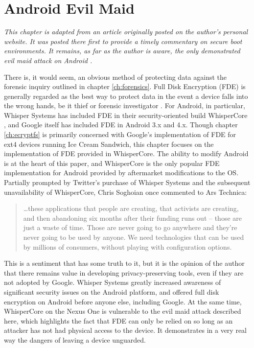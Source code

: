 \chapter{Android Evil Maid}
\label{ch:fde}

\emph{This chapter is adapted from an article originally posted on the author's personal website. It was posted there first to
provide a timely commentary on secure boot environments. It remains, as far as the author is aware, the only demonstrated evil maid
attack on Android \cite{androidevilmaid}.}

There is, it would seem, an obvious method of protecting data against the forensic inquiry outlined in chapter \ref{ch:forensics}.
Full Disk Encryption (FDE) is generally regarded as the best way to protect data in the event a device falls into the wrong hands,
be it thief or forensic investigator \cite{fdeworks}.  For Android, in particular, Whisper Systems has included FDE in their
security-oriented build WhisperCore \cite{whispercore}, and Google itself has included FDE in Android 3.x and 4.x. Though chapter
\ref{ch:ecryptfs} is primarily concerned with Google's implementation of FDE for ext4 devices running Ice Cream Sandwich, this chapter
focuses on the implementation of FDE provided in WhisperCore.  The ability to modify Android is at
the heart of this paper, and WhisperCore is the only popular FDE implementation for Android provided by aftermarket modifications to
the OS.  Partially prompted by Twitter's purchase of Whisper Systems and the subsequent unavailability of WhisperCore, Chris
Soghoian once commented to Ars Technica: \begin{quote} 
\ldots these applications that people are creating, that activists are creating, and then abandoning six months after their funding
runs out -- those are just a waste of time. Those are never going to go anywhere and they're never going to be used by anyone. We
need technologies that can be used by millions of consumers, without playing with configuration options. 

\hspace{\fill}\cite{arstechnica}
\end{quote}
This is a sentiment that has some truth to it, but it is the opinion of the author that there remains value in
developing privacy-preserving tools, even if they are not adopted by Google.  Whisper Systems greatly increased awareness of significant
security issues on the Android platform, and offered full disk encryption on Android before anyone else, including Google. 
At the same time, WhisperCore on the Nexus One is vulnerable to the evil maid attack described here, which highlights the fact that FDE can only be
relied on so long as an attacker has not had physical access to the device. It demonstrates in a very real way the dangers of
leaving a device unguarded. 

